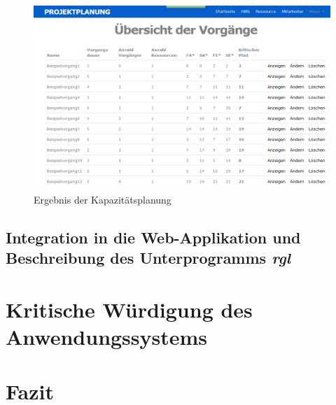 \documentclass[a4paper,12pt,parskip,bibtotoc,liststotoc]{article}
\begin{document}
\begin{figure}[h!]
  \begin{center}
    \includegraphics[width=120mm]{Bilder/Vorgaenge_Kostenpl.png}
    \caption{Ergebnis der Kapazitätsplanung}  \label{VorKo}
  \end{center}
\end{figure}

\subsection{Integration in die Web-Applikation und Beschreibung des Unterprogramms \textit{\glqq rgl\grqq}}\label{rgl}



\section{Kritische Würdigung des Anwendungssystems} \label{krit}

\section{Fazit} \label{Fazit}

\newpage
\end{document}
